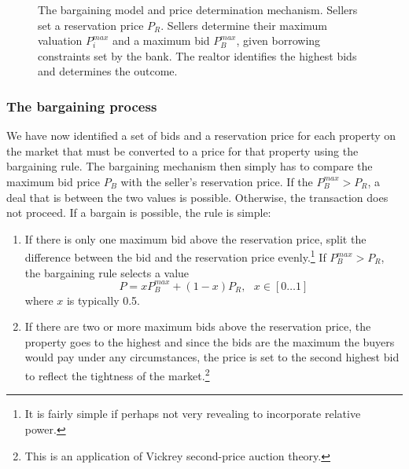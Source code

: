 \begin{figure}[!thb]
\centering

\caption[The bargaining model and price determination mechanism]{The bargaining model and price determination mechanism. Sellers set a reservation price $P_R$. Sellers determine their maximum valuation $P_i^{max}$ and a maximum bid $P_B^{max}$, given borrowing constraints set by the bank. The realtor identifies the highest bids and determines the outcome. }
\label{fig:Bargaining}
\end{figure}



\subsubsection{The bargaining process}
We have now identified a set of bids and a reservation price for each property on the market that must be converted to a price for that property using the bargaining rule. 
The bargaining  mechanism then simply has to compare the maximum bid price $P_B$ with the seller's reservation price. If the $P_B^{max}>P_R$, a deal that is between the two values is possible. Otherwise, the transaction does not proceed.
If a bargain is possible, the rule is simple: 
\begin{enumerate}
    \item If there is only one maximum bid above the reservation price, split the difference between the bid and the reservation price evenly.\footnote{It is fairly simple if perhaps not very revealing to incorporate relative power. %
    }
    If $P_B^{max}>P_R$,  the bargaining rule selects a value 
    \[P = xP_B^{max}+(1-x)P_R, \ \ \ x\in [0\dots 1] \]
where $x$ is typically 0.5.
    \item If there are two or more maximum bids above the reservation price, the property goes to the highest and since the bids are the maximum the buyers would pay under any circumstances, the price is set to the second highest bid to reflect the tightness of the market.\footnote{This is an application of Vickrey \gls{second-price auction} theory\cite{levinAuctionTheory2004}.} 

\end{enumerate}
 



